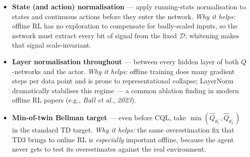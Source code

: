 \documentclass[11pt]{article}
\begin{document}
\begin{itemize}
\item
  \label{trick-4-8-5}\textbf{State (and action)
  normalisation} --- apply running-stats normalisation to states and
  continuous actions before they enter the network. \emph{Why it helps:}
  offline RL has no exploration to compensate for badly-scaled inputs,
  so the network must extract every bit of signal from the fixed
  \(\mathcal{D}\); whitening makes that signal scale-invariant.
\item
  \label{trick-4-8-6}\textbf{Layer normalisation
  throughout} --- between every hidden layer of both \(Q\)-networks and
  the actor. \emph{Why it helps:} offline training does many gradient
  steps per data point and is prone to representational collapse;
  LayerNorm dramatically stabilises this regime --- a common ablation
  finding in modern offline RL papers (e.g., \emph{Ball et al., 2023}).
\item
  \label{trick-4-8-7}\textbf{Min-of-twin Bellman target}
  --- even before CQL, take
  \(\min(\hat Q_{\theta_1^-}, \hat Q_{\theta_2^-})\) in the standard TD
  target. \emph{Why it helps:} the same overestimation fix that TD3
  brings to online RL is \emph{especially} important offline, because
  the agent never gets to test its overestimates against the real
  environment.
\end{itemize}

    \label{pseudo-4-8}
\end{document}
